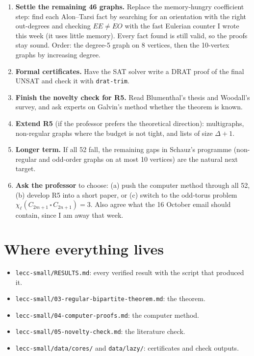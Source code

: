 \documentclass[11pt]{article}
\theoremstyle{plain}
\theoremstyle{definition}
\begin{document}
\begin{enumerate}[leftmargin=*]
  \item \textbf{Settle the remaining 46 graphs.} Replace the memory-hungry coefficient step:
        find each Alon--Tarsi fact by searching for an orientation with the right out-degrees
        and checking $EE \ne EO$ with the fast Eulerian counter I wrote this week (it uses
        little memory). Every fact found is still valid, so the proofs stay sound. Order: the
        degree-5 graph on 8 vertices, then the 10-vertex graphs by increasing degree.
  \item \textbf{Formal certificates.} Have the SAT solver write a DRAT proof of the final UNSAT
        and check it with \texttt{drat-trim}.
  \item \textbf{Finish the novelty check for R5.} Read Blumenthal's thesis and Woodall's survey,
        and ask experts on Galvin's method whether the theorem is known.
  \item \textbf{Extend R5} (if the professor prefers the theoretical direction): multigraphs,
        non-regular graphs where the budget is not tight, and lists of size $\Delta+1$.
  \item \textbf{Longer term.} If all 52 fall, the remaining gaps in Schauz's programme
        (non-regular and odd-order graphs on at most 10 vertices) are the natural next target.
  \item \textbf{Ask the professor} to choose: (a) push the computer method through all 52,
        (b) develop R5 into a short paper, or (c) switch to the odd-torus problem
        $\chi_\ell(C_{2m+1} \,\square\, C_{2n+1}) = 3$. Also agree what the 16 October email
        should contain, since I am away that week.
\end{enumerate}

\section*{Where everything lives}

\begin{itemize}[leftmargin=*,nosep]
  \item \texttt{lecc-small/RESULTS.md}: every verified result with the script that produced it.
  \item \texttt{lecc-small/03-regular-bipartite-theorem.md}: the theorem.
  \item \texttt{lecc-small/04-computer-proofs.md}: the computer method.
  \item \texttt{lecc-small/05-novelty-check.md}: the literature check.
  \item \texttt{lecc-small/data/cores/} and \texttt{data/lazy/}: certificates and check outputs.
\end{itemize}
\end{document}

